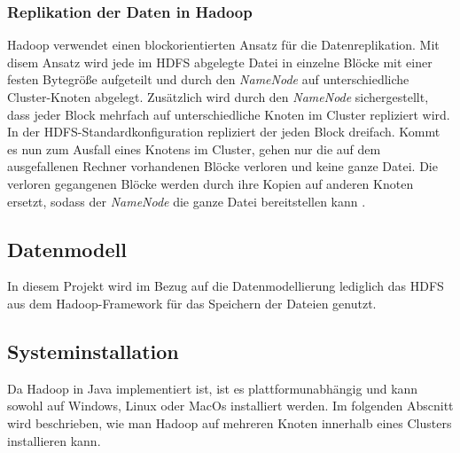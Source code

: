 \subsubsection{Replikation der Daten in Hadoop}
Hadoop verwendet einen blockorientierten Ansatz für die Datenreplikation. Mit disem Ansatz wird jede im \ac{HDFS} abgelegte Datei in einzelne Blöcke mit einer festen Bytegröße aufgeteilt und durch den \textit{NameNode} auf unterschiedliche Cluster-Knoten abgelegt. Zusätzlich wird durch den \textit{NameNode} sichergestellt, dass jeder Block mehrfach auf unterschiedliche Knoten im Cluster repliziert wird.
In der HDFS-Standardkonfiguration repliziert der \cite{replikation} jeden Block dreifach. Kommt es nun zum Ausfall eines Knotens im Cluster, gehen nur die auf dem ausgefallenen Rechner vorhandenen Blöcke verloren und keine ganze Datei. Die verloren gegangenen Blöcke werden durch ihre Kopien auf anderen Knoten ersetzt, sodass der \textit{NameNode} die ganze Datei bereitstellen kann \cite{replikation}.



\subsection{Datenmodell}
In diesem Projekt wird im Bezug auf die Datenmodellierung lediglich das \ac{HDFS} aus dem Hadoop-Framework für das Speichern der Dateien genutzt. 


\subsection{Systeminstallation} %
Da Hadoop in Java implementiert ist, ist es plattformunabhängig und kann sowohl auf Windows, Linux oder MacOs installiert werden.
Im folgenden Abscnitt wird beschrieben, wie man Hadoop auf mehreren Knoten innerhalb eines Clusters installieren kann. 

